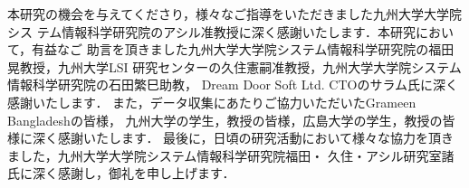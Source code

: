 \acknowledgment

本研究の機会を与えてくださり，様々なご指導をいただきました九州大学大学院シス
テム情報科学研究院のアシル准教授に深く感謝いたします．本研究において，有益なご
助言を頂きました九州大学大学院システム情報科学研究院の福田晃教授，九州大学LSI
研究センターの久住憲嗣准教授，九州大学大学院システム情報科学研究院の石田繁巳助教，
Dream Door Soft Ltd. CTOのサラム氏に深く感謝いたします．
また，データ収集にあたりご協力いただいたGrameen Bangladeshの皆様，
九州大学の学生，教授の皆様，広島大学の学生，教授の皆様に深く感謝いたします．
最後に，日頃の研究活動において様々な協力を頂きました，九州大学大学院システム情報科学研究院福田・
久住・アシル研究室諸氏に深く感謝し，御礼を申し上げます．


\newpage
